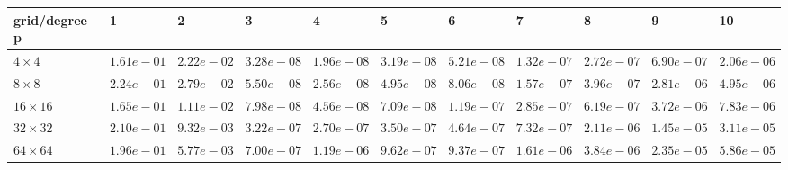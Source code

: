 \begin{tabular}{lllllllllll}
\hline
 grid/degree p   & 1          & 2          & 3          & 4          & 5          & 6          & 7          & 8          & 9          & 10         \\
\hline
 $4 \times 4$    & $1.61e-01$ & $2.22e-02$ & $3.28e-08$ & $1.96e-08$ & $3.19e-08$ & $5.21e-08$ & $1.32e-07$ & $2.72e-07$ & $6.90e-07$ & $2.06e-06$ \\
 $8 \times 8$    & $2.24e-01$ & $2.79e-02$ & $5.50e-08$ & $2.56e-08$ & $4.95e-08$ & $8.06e-08$ & $1.57e-07$ & $3.96e-07$ & $2.81e-06$ & $4.95e-06$ \\
 $16 \times 16$  & $1.65e-01$ & $1.11e-02$ & $7.98e-08$ & $4.56e-08$ & $7.09e-08$ & $1.19e-07$ & $2.85e-07$ & $6.19e-07$ & $3.72e-06$ & $7.83e-06$ \\
 $32 \times 32$  & $2.10e-01$ & $9.32e-03$ & $3.22e-07$ & $2.70e-07$ & $3.50e-07$ & $4.64e-07$ & $7.32e-07$ & $2.11e-06$ & $1.45e-05$ & $3.11e-05$ \\
 $64 \times 64$  & $1.96e-01$ & $5.77e-03$ & $7.00e-07$ & $1.19e-06$ & $9.62e-07$ & $9.37e-07$ & $1.61e-06$ & $3.84e-06$ & $2.35e-05$ & $5.86e-05$ \\
\hline
\end{tabular}